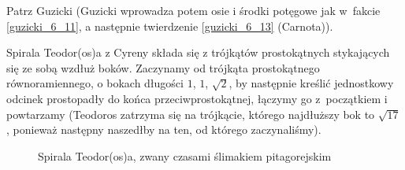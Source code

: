 Patrz Guzicki \cite[s. 170-173]{guzicki_2021} (Guzicki wprowadza potem osie i środki potęgowe jak w~fakcie \ref{guzicki_6_11}, a następnie twierdzenie \ref{guzicki_6_13} (Carnota)).

Spirala Teodor(os)a z Cyreny składa się z trójkątów prostokątnych stykających się ze sobą wzdłuż boków.
%
%
Zaczynamy od trójkąta prostokątnego równoramiennego, o bokach długości $1$, $1$, $\sqrt{2}$, by następnie kreślić jednostkowy odcinek prostopadły do końca przeciwprostokątnej, łączymy go z~początkiem i powtarzamy (Teodoros zatrzyma się na trójkącie, którego najdłuższy bok to $\sqrt{17}$, ponieważ następny naszedłby na ten, od którego zaczynaliśmy).
\begin{figure}[H]\centering
\begin{comment}
    \begin{tikzpicture}[scale=.7]
        \tkzDefPoints{0.0000000000000000/0.0000000000000000/sqrt0,1.0000000000000000/0.0000000000000000/sqrt1,1.0000000000000002/1.0000000000000000/sqrt2,0.2928932188134524/1.7071067811865475/sqrt3,-0.6927053408400360/1.8762087599123103/sqrt4,-1.6308097207961914/1.5298560894922923/sqrt5,-2.3149821631755443/0.8005358106787454/sqrt6,-2.6417995393402450/-0.1445516998920071/sqrt7,-2.5871641322679750/-1.1430580705747615/sqrt8,-2.1830320757712630/-2.0577587215594090/sqrt9,-1.4971125019181266/-2.7854360801498297/sqrt10,-0.6162802729096475/-3.2588646221072777/sqrt11,0.3663043810988235/-3.4446801158290160/sqrt12,1.3606978771718410/-3.3389371493126440/sqrt13,2.2867524231255560/-2.9615474595774080/sqrt14,3.0782592751547995/-2.3503871670266260/sqrt15,3.6851266321570497/-1.5555840398277552/sqrt16,4.0740226421139890/-0.634302381788492/sqrt17}
        \tkzDrawPolygons[line width=0.2mm](sqrt0,sqrt1,sqrt2 sqrt0,sqrt2,sqrt3 sqrt0,sqrt3,sqrt4 sqrt0,sqrt4,sqrt5 sqrt0,sqrt5,sqrt6 sqrt0,sqrt6,sqrt7 sqrt0,sqrt7,sqrt8 sqrt0,sqrt8,sqrt9 sqrt0,sqrt9,sqrt10 sqrt0,sqrt10,sqrt11 sqrt0,sqrt11,sqrt12 sqrt0,sqrt12,sqrt13 sqrt0,sqrt13,sqrt14 sqrt0,sqrt14,sqrt15 sqrt0,sqrt15,sqrt16 sqrt0,sqrt16,sqrt17)
        \tkzMarkRightAngle[size=0.25](sqrt0,sqrt1,sqrt2)
        \tkzMarkRightAngle[size=0.25](sqrt0,sqrt2,sqrt3)
        \tkzMarkRightAngle[size=0.25](sqrt0,sqrt3,sqrt4)
        \tkzMarkRightAngle[size=0.25](sqrt0,sqrt4,sqrt5)
        \tkzMarkRightAngle[size=0.25](sqrt0,sqrt5,sqrt6)
        \tkzMarkRightAngle[size=0.25](sqrt0,sqrt6,sqrt7)
        \tkzMarkRightAngle[size=0.25](sqrt0,sqrt7,sqrt8)
        \tkzMarkRightAngle[size=0.25](sqrt0,sqrt8,sqrt9)
        \tkzMarkRightAngle[size=0.25](sqrt0,sqrt9,sqrt10)
        \tkzMarkRightAngle[size=0.25](sqrt0,sqrt10,sqrt11)
        \tkzMarkRightAngle[size=0.25](sqrt0,sqrt11,sqrt12)
        \tkzMarkRightAngle[size=0.25](sqrt0,sqrt12,sqrt13)
        \tkzMarkRightAngle[size=0.25](sqrt0,sqrt13,sqrt14)
        \tkzMarkRightAngle[size=0.25](sqrt0,sqrt14,sqrt15)
        \tkzMarkRightAngle[size=0.25](sqrt0,sqrt15,sqrt16)
        \tkzMarkRightAngle[size=0.25](sqrt0,sqrt16,sqrt17)
\end{tikzpicture}
\end{comment}
\caption{Spirala Teodor(os)a, zwany czasami ślimakiem pitagorejskim}
\end{figure}
%

%